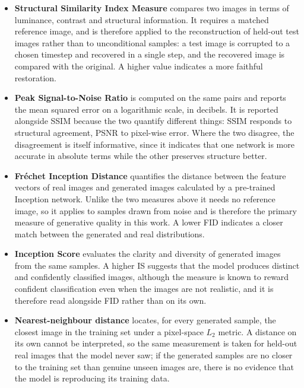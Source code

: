 \begin{itemize}
    \item \textbf{Structural Similarity Index Measure} compares two images in terms of luminance,
    contrast and structural information. It requires a matched reference image, and is therefore
    applied to the reconstruction of held-out test images rather than to unconditional samples: a
    test image is corrupted to a chosen timestep and recovered in a single step, and the recovered
    image is compared with the original. A higher value indicates a more faithful restoration.

    \item \textbf{Peak Signal-to-Noise Ratio} is computed on the same pairs and reports the mean
    squared error on a logarithmic scale, in decibels. It is reported alongside SSIM because the
    two quantify different things: SSIM responds to structural agreement, PSNR to pixel-wise
    error. Where the two disagree, the disagreement is itself informative, since it indicates that
    one network is more accurate in absolute terms while the other preserves structure better.

    \item \textbf{Fr\'echet Inception Distance} quantifies the distance between the feature
    vectors of real images and generated images calculated by a pre-trained Inception network.
    Unlike the two measures above it needs no reference image, so it applies to samples drawn from
    noise and is therefore the primary measure of generative quality in this work. A lower FID
    indicates a closer match between the generated and real distributions.

    \item \textbf{Inception Score} evaluates the clarity and diversity of generated images from
    the same samples. A higher IS suggests that the model produces distinct and confidently
    classified images, although the measure is known to reward confident classification even when
    the images are not realistic, and it is therefore read alongside FID rather than on its own.

    \item \textbf{Nearest-neighbour distance} locates, for every generated sample, the closest
    image in the training set under a pixel-space $L_2$ metric. A distance on its own cannot be
    interpreted, so the same measurement is taken for held-out real images that the model never
    saw; if the generated samples are no closer to the training set than genuine unseen images
    are, there is no evidence that the model is reproducing its training data.
\end{itemize}

